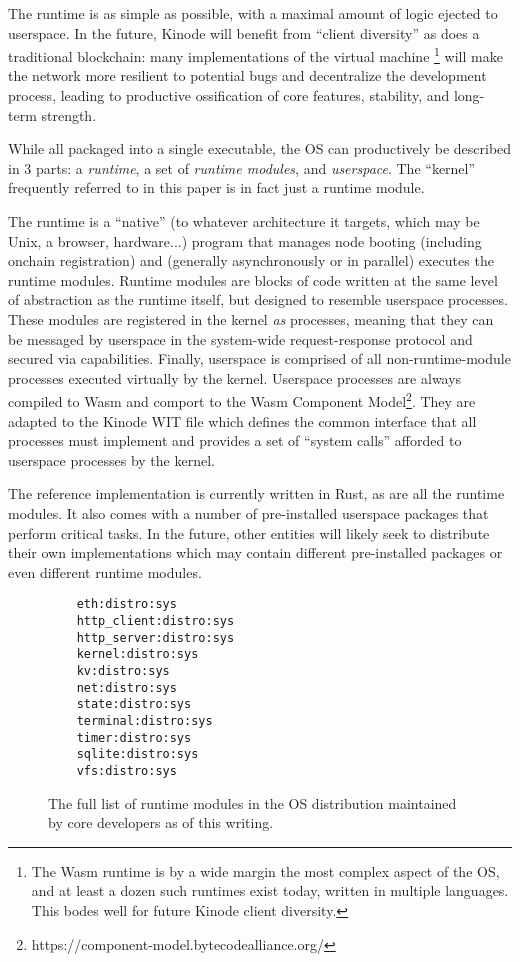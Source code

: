 \documentclass[runningheads]{llncs}
\begin{document}
The runtime is as simple as possible, with a maximal amount of logic ejected to userspace.
In the future, Kinode will benefit from ``client diversity'' as does a traditional blockchain: many implementations of the virtual machine
\footnote{The Wasm runtime is by a wide margin the most complex aspect of the OS, and at least a dozen such runtimes exist today, written in multiple languages.
This bodes well for future Kinode client diversity.}
will make the network more resilient to potential bugs and decentralize the development process, leading to productive ossification of core features, stability, and long-term strength.

While all packaged into a single executable, the OS can productively be described in 3 parts: a \textit{runtime}, a set of \textit{runtime modules}, and \textit{userspace}.
The ``kernel'' frequently referred to in this paper is in fact just a runtime module.

The runtime is a ``native'' (to whatever architecture it targets, which may be Unix, a browser, hardware...) program that manages node booting (including onchain registration) and (generally asynchronously or in parallel) executes the runtime modules.
Runtime modules are blocks of code written at the same level of abstraction as the runtime itself, but designed to resemble userspace processes.
These modules are registered in the kernel \textit{as} processes, meaning that they can be messaged by userspace in the system-wide request-response protocol and secured via capabilities.
Finally, userspace is comprised of all non-runtime-module processes executed virtually by the kernel.
Userspace processes are always compiled to Wasm and comport to the Wasm Component Model\footnote{https://component-model.bytecodealliance.org/}.
They are adapted to the Kinode WIT file which defines the common interface that all processes must implement and provides a set of ``system calls'' afforded to userspace processes by the kernel.

The reference implementation is currently written in Rust, as are all the runtime modules.
It also comes with a number of pre-installed userspace packages that perform critical tasks.
In the future, other entities will likely seek to distribute their own implementations which may contain different pre-installed packages or even different runtime modules.

\begin{figure}
    \centering
    \begin{lstlisting}
    eth:distro:sys
    http_client:distro:sys
    http_server:distro:sys
    kernel:distro:sys
    kv:distro:sys
    net:distro:sys
    state:distro:sys
    terminal:distro:sys
    timer:distro:sys
    sqlite:distro:sys
    vfs:distro:sys
    \end{lstlisting}
    \caption{The full list of runtime modules in the OS distribution maintained by core developers as of this writing.}
    \label{fig:runtime modules list}
\end{figure}
\end{document}
